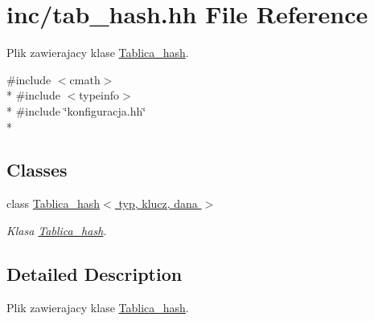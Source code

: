 \hypertarget{tab__hash_8hh}{\section{inc/tab\+\_\+hash.hh File Reference}
\label{tab__hash_8hh}
}


Plik zawierajacy klase \hyperlink{class_tablica__hash}{Tablica\+\_\+hash}.  


{\ttfamily \#include $<$cmath$>$}\\*
{\ttfamily \#include $<$typeinfo$>$}\\*
{\ttfamily \#include \char`\"{}konfiguracja.\+hh\char`\"{}}\\*
\subsection*{Classes}
\begin{DoxyCompactItemize}
\item 
class \hyperlink{class_tablica__hash}{Tablica\+\_\+hash$<$ typ, klucz, dana $>$}
\begin{DoxyCompactList}\small\item\em Klasa \hyperlink{class_tablica__hash}{Tablica\+\_\+hash}. \end{DoxyCompactList}\end{DoxyCompactItemize}


\subsection{Detailed Description}
Plik zawierajacy klase \hyperlink{class_tablica__hash}{Tablica\+\_\+hash}. 

